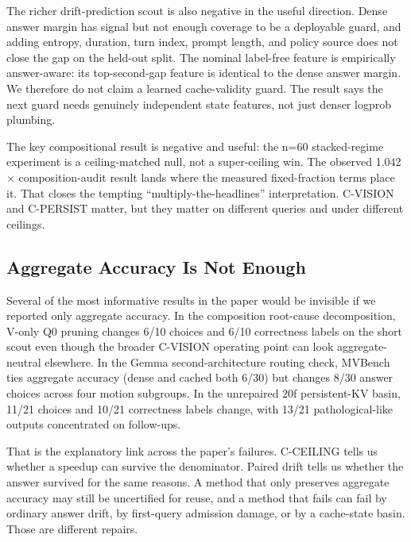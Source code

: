 The richer drift-prediction scout is also negative in the useful direction.
Dense answer margin has signal but not enough coverage to be a deployable
guard, and adding entropy, duration, turn index, prompt length, and policy
source does not close the gap on the held-out split. The nominal label-free
feature is empirically answer-aware: its top-second-gap feature is identical
to the dense answer margin. We therefore do not claim a learned cache-validity
guard. The result says the next guard needs genuinely independent state
features, not just denser logprob plumbing.

The key compositional result is negative and useful: the n=60
stacked-regime experiment is a ceiling-matched null, not a
super-ceiling win. The observed 1.042$\times$ composition-audit result lands where the
measured fixed-fraction terms place it. That closes the tempting
``multiply-the-headlines'' interpretation. C-VISION and C-PERSIST matter, but
they matter on different queries and under different ceilings.

\subsection{Aggregate Accuracy Is Not Enough}

Several of the most informative results in the paper would be invisible if we
reported only aggregate accuracy. In the composition root-cause decomposition,
V-only Q0 pruning changes 6/10 choices and 6/10 correctness labels on the
short scout even though the broader C-VISION operating point can look
aggregate-neutral elsewhere. In the Gemma second-architecture routing check,
MVBench ties aggregate accuracy (dense and cached both 6/30) but
changes 8/30 answer choices across four motion subgroups. In the unrepaired
20f persistent-KV basin, 11/21 choices and 10/21 correctness labels change,
with 13/21 pathological-like outputs concentrated on follow-ups.



That is the explanatory link across the paper's failures. C-CEILING tells us
whether a speedup can survive the denominator. Paired drift tells us whether
the answer survived for the same reasons. A method that only preserves aggregate
accuracy may still be uncertified for reuse, and a method that fails can fail by
ordinary answer drift, by first-query admission damage, or by a cache-state
basin. Those are different repairs.
